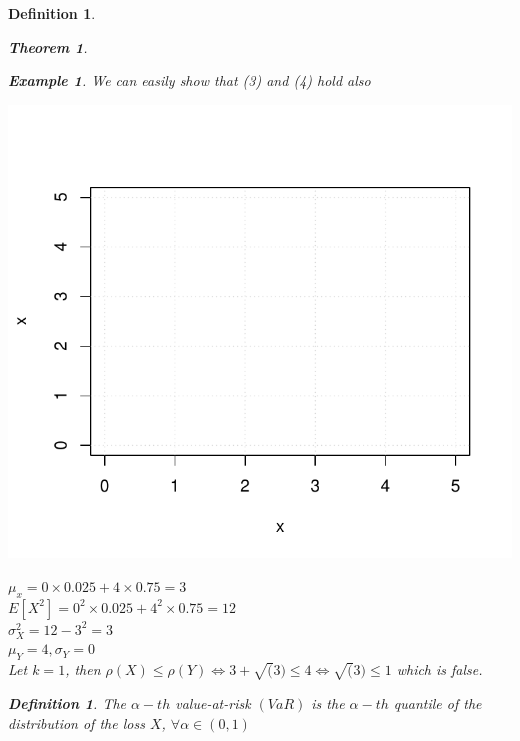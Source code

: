 \documentclass[11pt,a4paper,oneside]{article}\usepackage[]{graphicx}\usepackage[]{color}
\makeatletter
\def\maxwidth{ %
  \ifdim\Gin@nat@width>\linewidth
    \linewidth
  \else
    \Gin@nat@width
  \fi
}
\newenvironment{kframe}{%
 \def\at@end@of@kframe{}%
 \ifinner\ifhmode%
  \def\at@end@of@kframe{\end{minipage}}%
  \begin{minipage}{\columnwidth}%
 \fi\fi%
 \def\FrameCommand##1{\hskip\@totalleftmargin \hskip-\fboxsep
 \colorbox{shadecolor}{##1}\hskip-\fboxsep
     \hskip-\linewidth \hskip-\@totalleftmargin \hskip\columnwidth}%
 \MakeFramed {\advance\hsize-\width
   \@totalleftmargin\z@ \linewidth\hsize
   \@setminipage}}%
 {\par\unskip\endMakeFramed%
 \at@end@of@kframe}
\newenvironment{knitrout}{}{} %
\newtheorem{thm}{Theorem}[subsection]
\newtheorem{defi}[subsection]{Definition}
\newtheorem{exm}{Example}
\makeatother
\begin{document}
\begin{algin*}
\begin{defi}
\begin{thm}
\begin{exm}
We  can easily show that (3) and (4) hold also 
\begin{knitrout}
\color{fgcolor}\begin{kframe}


{\ttfamily\noindent\bfseries\color{errorcolor}{\#\# Error in xy.coords(x, y): 'x' and 'y' lengths differ}}\end{kframe}

{\centering \includegraphics[width=\maxwidth]{figure/33-1} 

}



\end{knitrout}

$\mu_x=0\times 0.025+4\times0.75=3$\\
$E[X^2]=0^2\times0.025+4^2\times 0.75=12$\\
$\sigma^2_X=12-3^2=3$\\
$\mu_Y=4,\sigma_Y=0$\\
Let $k=1$, then $\rho(X)\leq\rho(Y)\Leftrightarrow 3+\sqrt(3)\leq 4\Leftrightarrow \sqrt(3)\leq 1$ which is false.
\end{exm}
                        
\begin{defi} The $\alpha-th$ value-at-risk $(VaR)$ is the $\alpha-th$ quantile of the distribution of the loss $X$, $\forall \alpha\in(0,1)$\\


\end{defi}
\end{thm}
\end{defi}
\end{algin*}
\end{document}
